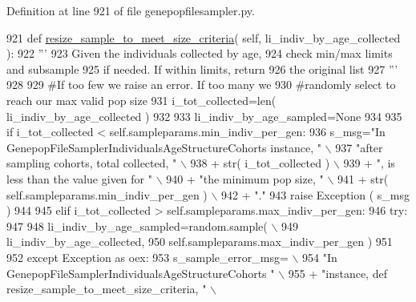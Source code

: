 Definition at line 921 of file genepopfilesampler.\+py.


\begin{DoxyCode}
921     \textcolor{keyword}{def }\hyperlink{classnegui_1_1genepopfilesampler_1_1GenepopFileSamplerCohorts_a765e68f8d835bde418cd8c3005b0a97a}{resize\_sample\_to\_meet\_size\_criteria}( self, 
      li\_indiv\_by\_age\_collected ):
922         \textcolor{stringliteral}{'''}
923 \textcolor{stringliteral}{        Given the individuals collected by age, }
924 \textcolor{stringliteral}{        check min/max limits and subsample}
925 \textcolor{stringliteral}{        if needed.  If within limits, return}
926 \textcolor{stringliteral}{        the original list}
927 \textcolor{stringliteral}{        '''}
928 
929         \textcolor{comment}{#If too few we raise an error.  If too many we}
930         \textcolor{comment}{#randomly select to reach our max valid pop size}
931         i\_tot\_collected=len( li\_indiv\_by\_age\_collected )
932 
933         li\_indiv\_by\_age\_sampled=\textcolor{keywordtype}{None}
934 
935         \textcolor{keywordflow}{if} i\_tot\_collected < self.sampleparams.min\_indiv\_per\_gen:
936             s\_msg=\textcolor{stringliteral}{"In GenepopFileSamplerIndividualsAgeStructureCohorts instance, "} \(\backslash\)
937                     \textcolor{stringliteral}{"after sampling cohorts, total collected, "} \(\backslash\)
938                     + str( i\_tot\_collected ) \(\backslash\)
939                     + \textcolor{stringliteral}{", is less than the value given for "} \(\backslash\)
940                     + \textcolor{stringliteral}{"the minimum pop size, "} \(\backslash\)
941                     + str( self.sampleparams.min\_indiv\_per\_gen ) \(\backslash\)
942                     + \textcolor{stringliteral}{"."}
943             \textcolor{keywordflow}{raise} Exception ( s\_msg )
944 
945         \textcolor{keywordflow}{elif} i\_tot\_collected > self.sampleparams.max\_indiv\_per\_gen:
946             \textcolor{keywordflow}{try}:
947 
948                 li\_indiv\_by\_age\_sampled=random.sample( \(\backslash\)
949                                     li\_indiv\_by\_age\_collected,
950                                     self.sampleparams.max\_indiv\_per\_gen )
951                                         
952             \textcolor{keywordflow}{except} Exception \textcolor{keyword}{as} oex:
953                 s\_sample\_error\_msg= \(\backslash\)
954                     \textcolor{stringliteral}{"In GenepopFileSamplerIndividualsAgeStructureCohorts "} \(\backslash\)
955                         + \textcolor{stringliteral}{"instance, def resize\_sample\_to\_meet\_size\_criteria, "}  \(\backslash\)

\end{DoxyCode}

